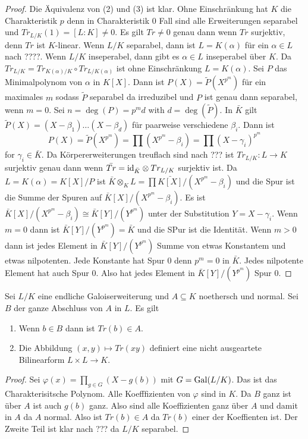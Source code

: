 \begin{proof}
	Die Äquivalenz von (2) und (3) ist klar.
	Ohne Einschränkung hat \(K\) die Charakteristik \(p\) denn in Charakteristik \(0\) Fall sind alle
	Erweiterungen separabel und \(Tr_{L/K}(1)=[L:K]\neq 0\).
	Es gilt \(Tr\neq 0\) genau dann wenn \(Tr\) surjektiv, denn \(Tr\) ist \(K\)-linear.
	Wenn \(L/K\) separabel, dann ist \(L=K(\alpha)\) für ein \(\alpha\in L\) nach ????.
	Wenn \(L/K\) inseperabel, dann gibt es \(\alpha\in L\) inseperabel über \(K\).
	Da \(Tr_{L/K}=Tr_{K(\alpha)/K}\circ Tr_{L/K(\alpha)}\) ist ohne Einschränkung \(L=K(\alpha)\).
	Sei \(P\) das Minimalpolynom von \(\alpha\) in \(K[X]\).
	Dann ist \(P(X)=\tilde P(X^{p^m})\) für ein maximales \(m\) sodass \(\tilde P\) separabel da irreduzibel und 
	\(P\) ist genau dann separabel, wenn \(m=0\).
	Sei \(n=\deg(P)=p^md\) with \(d=\deg(\tilde P)\).
	In \(\bar K\) gilt \(\tilde P(X)=(X-\beta_1)\dots (X-\beta_d)\) für paarweise verschiedene 
	\(\beta_i\). 
	Dann ist 
	\[P(X)=\tilde P(X^{p^m})=\prod (X^{p^m}-\beta_i)=\prod (X-\gamma_i)^{p^m}\]
	for \(\gamma_i\in\bar K\).
	Da Körpererweiterungen treuflach sind nach ??? ist \(Tr_{L/K}\colon L\to K\) surjektiv genau dann wenn 
	\(\bar{Tr}=\mathrm{id}_{\bar K}\otimes Tr_{L/K}\) surjektiv ist.
	Da \(L=K(\alpha)=K[X]/P\) ist \(\bar K\otimes_KL=\prod \bar{K[X]}/(X^{p^m}-\beta_i)\) und die Spur ist die Summe
	der Spuren auf \(\bar K[X]/(X^{p^m}-\beta_i)\).
	Es ist \(\bar K[X]/(X^{p^m}-\beta_i)\cong \bar K[Y]/(Y^{p^m})\) unter der Substitution
	\(Y=X-\gamma_i\).
	Wenn \(m=0\) dann ist \(\bar K[Y]/(Y^{p^m})=\bar K\) und die SPur ist die Identität.
	Wenn \(m>0\) dann ist jedes Element in \(\bar K[Y]/(Y^{p^m})\) Summe von etwas Konstantem und etwas nilpotenten.
	Jede Konstante hat Spur \(0\) denn \(p^m=0\) in \(\bar K\).
	Jedes nilpotente Element hat auch Spur \(0\). Also hat jedes Element in \(\bar K[Y]/(Y^{p^m})\) Spur \(0\).
\end{proof}
\begin{Satz}
	Sei \(L/K\) eine endliche Galoiserweiterung und \(A\subseteq K\) noethersch und normal.
	Sei \(B\) der ganze Abschluss von \(A\) in \(L\).
	Es gilt
	\begin{enumerate}
		\item Wenn \(b\in B\) dann ist \(Tr(b)\in A\).
		\item Die Abbildung \((x,y)\mapsto Tr(xy)\) definiert eine nicht ausgeartete Bilinearform \(L\times L\to K\).
	\end{enumerate}
\end{Satz}
\begin{proof}
	Sei \(\varphi(x)=\prod_{g\in G}(X-g(b))\) mit \(G=\operatorname{Gal}(L/K)\). Das ist das Charakterisitsche Polynom.
	Alle Koefffizienten von \(\varphi\) sind in \(K\). Da \(B\) ganz ist über \(A\) ist auch \(g(b)\) ganz.
	Also sind alle Koeffizienten ganz über \(A\) und damit in \(A\) da \(A\) normal.
	Also ist \(Tr(b)\in A\) da \(Tr(b)\) einer der Koeffienten ist.
	Der Zweite Teil ist klar nach ??? da \(L/K\) separabel.
\end{proof}
